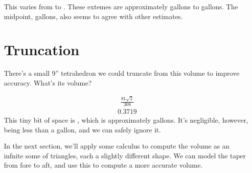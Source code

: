 \documentclass[letterpaper,10pt,english]{sphinxmanual}
\begin{document}
\sphinxAtStartPar
This varies from  to .
These extemes are approximately  gallons to  gallons.
The midpoint,  gallons, also seems to agree with other estimates.


\section{Truncation}
\label{\detokenize{tetrahedron:truncation}}
\sphinxAtStartPar
There’s a small 9” tetrahedron we could truncate from this volume to improve accuracy. What’s its volume?

\begin{sphinxVerbatim}[commandchars=\\\{\}]
        
\end{sphinxVerbatim}

\begin{sphinxVerbatim}[commandchars=\\\{\}]
 
 
\end{sphinxVerbatim}
\begin{equation*}
\begin{split}\displaystyle \frac{81 \sqrt{2}}{308}\end{split}
\end{equation*}\begin{equation*}
\begin{split}\displaystyle 0.3719\end{split}
\end{equation*}
\sphinxAtStartPar
This tiny bit of space is , which is approximately  gallons.
It’s negligible, however, being less than a gallon, and we can safely ignore it.

\sphinxAtStartPar
In the next section, we’ll apply some calculus to compute the volume as an infnite some of triangles, each a slightly different shape. We can model the taper from fore to aft, and use this to compute a more accurate volume.
\end{document}
